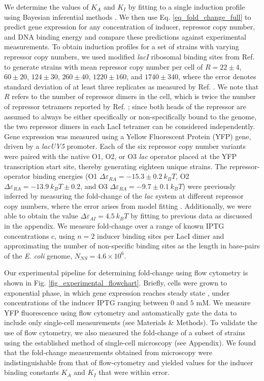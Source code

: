We determine the values of $K_A$ and $K_I$ by fitting to a single induction
profile using Bayesian inferential methods \cite{Sivia2006}. We then use
Eq. \ref{eq_fold_change_full} to predict gene expression for any concentration of
inducer, repressor copy number, and DNA binding energy and compare these
predictions against experimental measurements. To obtain induction profiles for
a set of strains with varying repressor copy numbers, we used modified
\textit{lacI} ribosomal binding sites from Ref. \cite{Garcia2011} to generate
strains with mean repressor copy number per cell of $R = 22 \pm 4$, $60 \pm 20$,
$124 \pm 30$, $260 \pm 40$, $1220 \pm 160$, and $1740 \pm 340$, where the error
denotes standard deviation of at least three replicates as measured by
Ref. \cite{Garcia2011}. We note that $R$ refers to the number of repressor dimers
in the cell, which is twice the number of repressor tetramers reported by
Ref. \cite{Garcia2011}; since both heads of the repressor are assumed to always
be either specifically or non-specifically bound to the genome, the two
repressor dimers in each LacI tetramer can be considered independently. Gene
expression was measured using a Yellow Fluorescent Protein (YFP) gene, driven by
a \textit{lacUV5} promoter. Each of the six repressor copy number variants were
paired with the native O1, O2, or O3 \textit{lac} operator \cite{Oehler1994}
placed at the YFP transcription start site, thereby generating eighteen unique
strains. The repressor-operator binding energies (O1 $\Delta\varepsilon_{RA} =
-15.3 \pm 0.2~k_BT$, O2 $\Delta\varepsilon_{RA} = -13.9~k_BT \pm 0.2$, and O3
$\Delta\varepsilon_{RA} = -9.7 \pm 0.1~k_BT$) were previously inferred by
measuring the fold-change of the \textit{lac} system at different repressor copy
numbers, where the error arises from model fitting \cite{Garcia2011}.
Additionally, we were able to obtain the value $\Delta \varepsilon_{AI} = 4.5\
k_BT$ by fitting to previous data as discussed in the appendix. We measure fold-change over a range of
known IPTG concentrations $c$, using $n=2$ inducer binding sites per LacI dimer
and approximating the number of non-specific binding sites as the length in
base-pairs of the \textit{E. coli} genome, $N_{NS} = 4.6 \times 10^6$.

Our experimental pipeline for determining fold-change using flow cytometry is
shown in Fig. \ref{fig_experimental_flowchart}. Briefly, cells were grown to
exponential phase, in which gene expression reaches steady state
\cite{Scott2010}, under concentrations of the inducer IPTG ranging between 0
and $5$ mM. We measure YFP fluorescence using flow cytometry and
automatically gate the data to include only single-cell measurements (see
Materials \& Methods). To validate
the use of flow cytometry, we also measured the fold-change of a subset of
strains using the established method of single-cell microscopy (see Appendix). We found that the fold-change measurements obtained
from microscopy were indistinguishable from that of flow-cytometry and yielded
values for the inducer binding constants $K_A$ and $K_I$ that were within error.

